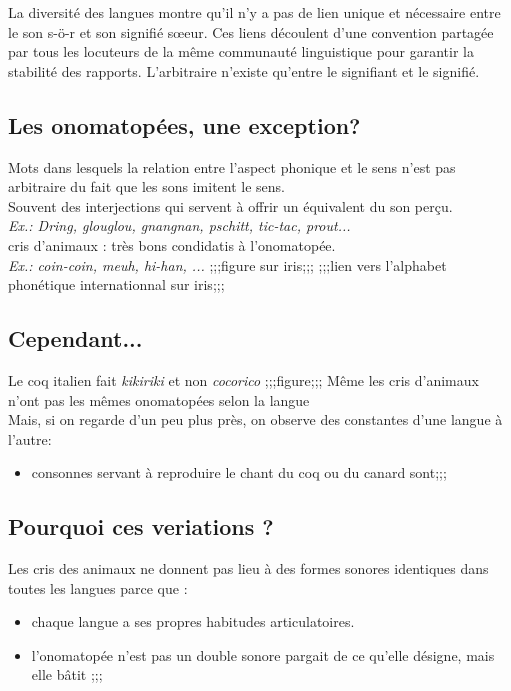La diversité des langues montre qu'il n'y a pas de lien unique et nécessaire entre le son \/s-ö-r\/ et son signifié sœeur.
Ces liens découlent d'une convention partagée par tous les locuteurs de la même communauté linguistique pour garantir la stabilité des rapports.
L'arbitraire n'existe qu'entre le signifiant et le signifié.

\subsection{Les onomatopées, une exception?}
\begin{def}
      Mots dans lesquels la relation entre l'aspect phonique et le sens n'est pas arbitraire du fait que les sons imitent le sens.\\
      Souvent des interjections qui servent à offrir un équivalent du son perçu.\\
      \textit{Ex.: Dring, glouglou, gnangnan, pschitt, tic-tac, prout...}\\
      cris d'animaux : très bons condidatis à l'onomatopée.\\
      \textit{Ex.: coin-coin, meuh, hi-han, ...}
      ;;;figure sur iris;;;
      ;;;lien vers l'alphabet phonétique internationnal sur iris;;;
\end{def}

\subsection{Cependant...}

Le coq italien fait \textit{kikiriki} et non \textit{cocorico}
;;;figure;;;
Même les cris d'animaux n'ont pas les mêmes onomatopées selon la langue\\
Mais, si on regarde d'un peu plus près, on observe des constantes d'une langue à l'autre: \\
\begin{itemize}
         \item consonnes servant à reproduire le chant du coq ou du canard sont;;;
\end{itemize}

\subsection{Pourquoi ces veriations ?}
Les cris des animaux ne donnent pas lieu à des formes sonores identiques dans toutes les langues parce que : 
\begin{itemize}
         \item chaque langue a ses propres habitudes articulatoires.
         \item l'onomatopée n'est pas un double sonore pargait de ce qu'elle désigne, mais elle bâtit ;;;
\end{itemize}

